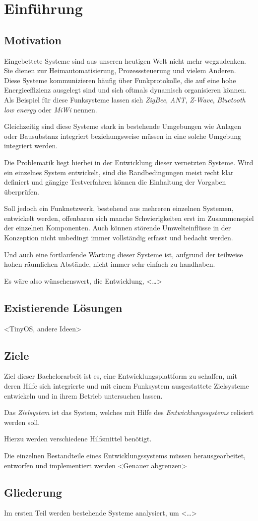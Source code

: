 \chapter{Einführung}
\adjustmtc
\minitoc
\section{Motivation}
Eingebettete Systeme sind aus unseren heutigen Welt nicht mehr wegzudenken. Sie
dienen zur Heimautomatisierung, Prozesssteuerung und vielem
Anderen. Diese Systeme kommunizieren
häufig über Funkprotokolle, die auf eine hohe Energieeffizienz ausgelegt sind
und sich oftmals dynamisch organisieren können. Als Beispiel für diese
Funksysteme lassen sich \emph{ZigBee}, \emph{ANT}, \emph{Z-Wave},
\emph{Bluetooth low energy} oder \emph{MiWi} nennen.

Gleichzeitig sind diese Systeme stark in bestehende Umgebungen wie Anlagen oder
Bausubstanz integriert beziehungsweise müssen in eine solche Umgebung
integriert werden.

Die Problematik liegt hierbei in der Entwicklung dieser vernetzten Systeme. Wird
ein einzelnes System entwickelt, sind die Randbedingungen meist recht klar
definiert und gängige Testverfahren können die Einhaltung der Vorgaben
überprüfen.

Soll jedoch ein Funknetzwerk, bestehend aus mehreren einzelnen Systemen,
entwickelt werden, offenbaren sich manche Schwierigkeiten erst im
Zusammenspiel der einzelnen Komponenten. Auch können störende
Umwelteinflüsse in der Konzeption nicht unbedingt immer vollständig erfasst und
bedacht werden.

Und auch eine fortlaufende Wartung dieser Systeme ist, aufgrund der teilweise
hohen räumlichen Abstände, nicht immer sehr einfach zu handhaben. 

Es wäre also wünschenswert, die Entwicklung,  <\ldots>
\section{Existierende Lösungen}
<TinyOS, andere Ideen>
\section{Ziele}
Ziel dieser Bachelorarbeit ist es, eine Entwicklungsplattform zu schaffen,
mit deren Hilfe sich integrierte und mit einem Funksystem ausgestattete
Zielsysteme entwickeln und in ihrem Betrieb untersuchen lassen.
\begin{definition}[Zielsystem]
Das \emph{Zielsystem} ist das System, welches mit Hilfe des
\emph{Entwicklungssystems} relisiert werden soll.
\end{definition}
Hierzu werden verschiedene Hilfsmittel benötigt.

Die einzelnen Bestandteile eines Entwicklungssystems müssen herausgearbeitet,
entworfen und implementiert werden
<Genauer abgrenzen>
\section{Gliederung}
Im ersten Teil werden bestehende Systeme analysiert, um <\ldots>
